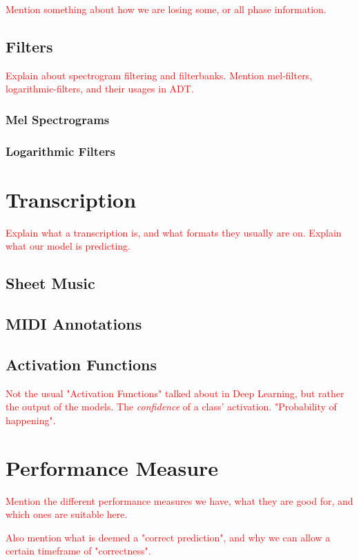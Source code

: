 \textcolor{red}{Mention something about how we are losing some, or all phase information.}

\subsection{Filters}

\textcolor{red}{Explain about spectrogram filtering and filterbanks. Mention mel-filters, logarithmic-filters, and their usages in ADT.}

\subsubsection{Mel Spectrograms}

\subsubsection{Logarithmic Filters}

\section{Transcription}

\textcolor{red}{Explain what a transcription is, and what formats they usually are on. Explain what our model is predicting.}

\subsection{Sheet Music}

\subsection{MIDI Annotations}

\subsection{Activation Functions}

\textcolor{red}{Not the usual "Activation Functions" talked about in Deep Learning, but rather the output of the models. The \textit{confidence} of a class' activation. "Probability of happening".}

\section{Performance Measure}

\textcolor{red}{Mention the different performance measures we have, what they are good for, and which ones are suitable here.}

\textcolor{red}{Also mention what is deemed a "correct prediction", and why we can allow a certain timeframe of "correctness".}